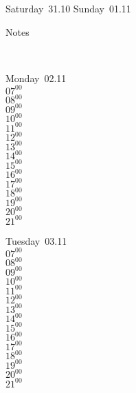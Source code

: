 \documentclass[11pt,a4paper]{book}\usepackage[]{graphicx}\usepackage[]{color}
\begin{document}
{{{{{{{{{{{{{{{{{{\begin{tcolorbox}
\end{tcolorbox} 
\begin{tcolorbox}[height=(\textheight-10mm)/6]
Saturday~31.10
\tcblower
Sunday~01.11
\end{tcolorbox} %
\begin{tcolorbox}[height=(\textheight-10mm)/6,sidebyside=false]
Notes
\end{tcolorbox}
\clearpage
\vspace{2 mm}\\
\begin{tcolorbox}
Monday~02.11\\
{ 
  $07^{00}$\\
$08^{00}$\\
$09^{00}$\\
$10^{00}$\\
$11^{00}$\\
$12^{00}$\\
$13^{00}$\\
$14^{00}$\\
$15^{00}$\\
$16^{00}$\\
$17^{00}$\\
$18^{00}$\\
$19^{00}$\\
$20^{00}$\\
$21^{00}$}\\

\end{tcolorbox}
\begin{tcolorbox}
Tuesday~03.11\\
{ 
  $07^{00}$\\
$08^{00}$\\
$09^{00}$\\
$10^{00}$\\
$11^{00}$\\
$12^{00}$\\
$13^{00}$\\
$14^{00}$\\
$15^{00}$\\
$16^{00}$\\
$17^{00}$\\
$18^{00}$\\
$19^{00}$\\
$20^{00}$\\
$21^{00}$}\\


\end{tcolorbox}}}}}}}}}}}}}}}}}}}
\end{document}
